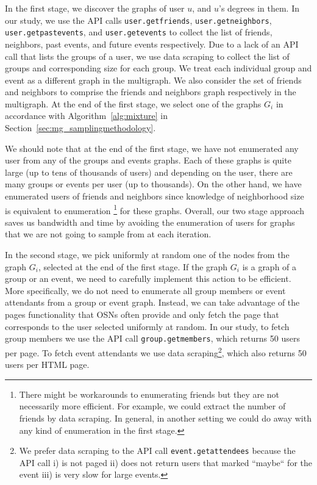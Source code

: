 \documentclass[10pt, conference]{./IEEEtran}
\begin{document}
In the first stage, we discover the graphs of user $u$, and $u$'s degrees in them.
In our study, we use the API calls {\tt user.getfriends}, {\tt user.getneighbors}, {\tt user.getpastevents}, and {\tt user.getevents} to collect the list of friends, neighbors, past events, and future events respectively. Due to a lack of an API call that lists the groups of a user, we use data scraping to collect the list of groups and corresponding size for each group. We treat each individual group and event as a different graph in the multigraph. We also consider the set of friends and neighbors to comprise the friends and neighbors graph respectively in the multigraph.  At the end of the first stage, we select one of the graphs $G_i$ in accordance with Algorithm~\ref{alg:mixture} in Section~\ref{sec:mg_samplingmethodology}.


We should note that at the end of the first stage, we have not enumerated any user from any of the groups and events graphs. Each of these graphs is quite large (up to tens of thousands of users) and depending on the user, there are many groups or events per user (up to thousands).  On the other hand, we have enumerated users of friends and neighbors since knowledge of neighborhood size is equivalent to enumeration  \footnote{There might be workarounds to enumerating friends but they are not necessarily more efficient. For example, we could extract the number of friends by data scraping.  In general, in another setting we could do away with any kind of enumeration in the first stage.} for these graphs.  Overall, our two stage approach saves us bandwidth and time by avoiding the enumeration of users for graphs that we are not going to sample from at each iteration.

In the second stage, we pick uniformly at random one of the nodes from the graph $G_i$, selected at the end of the first stage. If the graph $G_i$ is a graph of a group or an event, we need to carefully implement this action to be efficient. More specifically, we do not need to enumerate all group members or event attendants from a group or event graph. Instead, we can take advantage of the pages functionality that OSNs often provide and only fetch the page that corresponds to the user selected uniformly at random. In our study, to fetch group members we use the API call {\tt group.getmembers}, which returns 50 users per page. To fetch event attendants we use data scraping\footnote{We prefer data scraping to the API call {\tt event.getattendees} because the API call i) is not paged ii)  does not return users that marked  ``maybe`` for the event iii) is very slow for large events.}, which also returns  50 users per HTML page.
%
\end{document}
